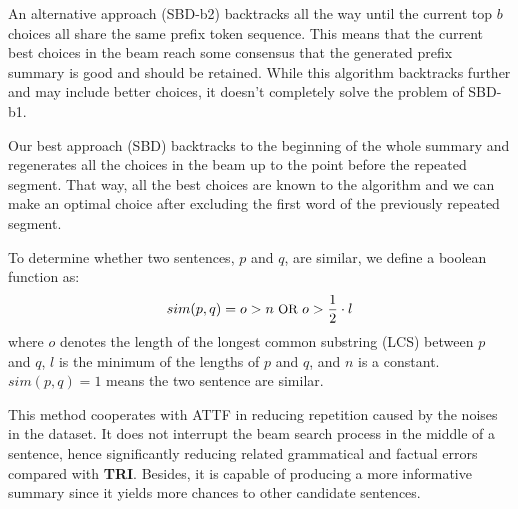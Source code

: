 An alternative approach (SBD-b2) backtracks all the way until the current
top $b$ choices all share the same prefix token sequence. This means
that the current best choices in the beam reach some consensus that
the generated prefix summary is good and should be retained. While
this algorithm backtracks further and may include better choices,
it doesn't completely solve the problem of SBD-b1.

Our best approach (SBD) backtracks to the beginning of the whole summary
and regenerates all the choices in the beam up to the point before
the repeated segment. That way, all the best choices are known to the
algorithm and we can make an optimal choice after excluding the first word
of the previously repeated segment. 

To determine whether two sentences, 
$p$ and $q$, are similar, we define a boolean function as:
\begin{equation}\label{eq:s}
\small
    sim(p,q) = o > n\text{ OR }o > \frac{1}{2}\cdot l
\end{equation}
where $o$ denotes the length of the longest common substring (LCS) between $p$ and $q$, 
$l$ is the minimum of the lengths of $p$ and $q$, and $n$ is a constant. 
$sim(p,q)=1$ means the two sentence are similar.

This method cooperates with ATTF in 
reducing repetition caused by the noises in the dataset.
It does not interrupt the beam search process in the middle of a sentence, 
hence significantly reducing related grammatical and factual errors 
compared with \textbf{TRI}.
Besides, it is capable of producing a more informative summary since
it yields more chances to other candidate sentences.
